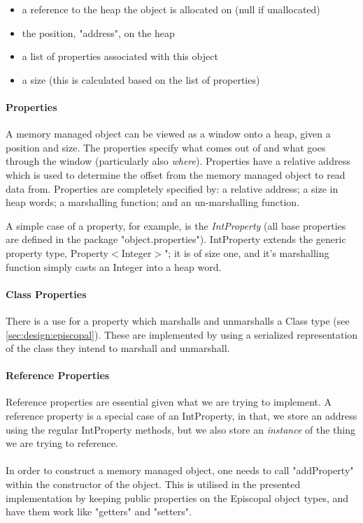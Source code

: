 \documentclass[]{article}
\begin{document}
\begin{itemize}
	\item a reference to the heap the object is allocated on (null if unallocated)
	\item the position, "address", on the heap
	\item a list of properties associated with this object
	\item a size (this is calculated based on the list of properties)
\end{itemize}

\paragraph{Properties}
A memory managed object can be viewed as a window onto a heap, given a position and size. The properties specify what comes out of and what goes through the window (particularly also \emph{where}). Properties have a relative address which is used to determine the offset from the memory managed object to read data from. Properties are completely specified by: a relative address; a size in heap words; a marshalling function; and an un-marshalling function.

A simple case of a property, for example, is the \emph{IntProperty} (all base properties are defined in the package "object.properties"). IntProperty extends the generic property type, Property$<$Integer$>$"; it is of size one, and it's marshalling function simply casts an Integer into a heap word.

\paragraph{Class Properties}
There is a use for a property which marshalls and unmarshalls a Class type (see \ref{sec:design:episcopal}). These are implemented by using a serialized representation of the class they intend to marshall and unmarshall.

\paragraph{Reference Properties}
Reference properties are essential given what we are trying to implement. A reference property is a special case of an IntProperty, in that, we store an address using the regular IntProperty methods, but we also store an \emph{instance} of the thing we are trying to reference. 
\\\\
In order to construct a memory managed object, one needs to call "addProperty" within the constructor of the object. This is utilised in the presented implementation by keeping public properties on the Episcopal object types, and have them work like "getters" and "setters".
\end{document}
